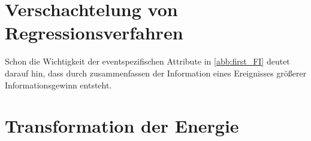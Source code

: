
\section{Verschachtelung von Regressionsverfahren}

Schon die Wichtigkeit der eventspezifischen Attribute in \autoref{abb:first_FI} deutet darauf hin, dass durch zusammenfassen der Information eines Ereignisses
größerer Informationsgewinn entsteht.


\section{Transformation der Energie}
